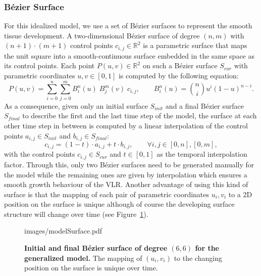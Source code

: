 \documentclass[11pt,a4paper, draft]{article}
\begin{document}
\subsubsection{B\'ezier Surface}
For this idealized model, we use a set of B\'ezier surfaces to represent the smooth tissue development. A two-dimensional B\'ezier surface of degree $(n, m)$ with $(n+1) \cdot (m+1)$ control points $c_{i, j} \in \mathbb{R}^2$ is a parametric surface that maps the unit square into a smooth-continuous surface embedded in the same space as its control points. Each point $P(u, v) \in \mathbb{R}^2$ on such a B\'ezier surface $S_{cur}$ with parametric coordinates $u ,v \in [0,1]$ is computed by the following equation:
\begin{equation}
P(u, v) = \sum_{i=0}^{n} \sum_{j=0}^{m} B_{i}^{n} (u) \; B_{j}^{m} (v) \; c_{i,j}, \qquad B_{i}^{n} (u) = \binom{n}{i} u^i (1-u)^{n-i}.
\end{equation}
As a consequence, given only an initial surface $S_{init}$ and a final B\'ezier surface $S_{final}$ to describe the first and the last time step of the model, the surface at each other time step in between is computed by a linear interpolation of the control points $a_{i,j} \in S_{init}$ and $b_{i,j} \in S_{final}$:
\begin{equation}
c_{i,j} = (1-t) \cdot a_{i,j} + t \cdot b_{i,j}, \qquad \forall i, j \in [0, n], [0, m],
\end{equation}
with the control points $c_{i,j} \in S_{cur}$ and $t \in [0,1]$ as the temporal interpolation factor. Through this, only two B\'ezier surfaces need to be generated manually for the model while the remaining ones are given by interpolation which ensures a smooth growth behaviour of the VLR. Another advantage of using this kind of surface is that the mapping of each pair of parametric coordinates $u_i, v_i$ to a 2D position on the surface is unique although of course the developing surface structure will change over time (see Figure~\ref{fig:modelSurface}).
%
\begin{figure}[htbp]
	\begin{center}
		\begin{overpic}[width=1.\linewidth]{images/modelSurface.pdf}
		\end{overpic}
\caption[Initial and final B\'ezier surface of degree $(6, 6)$ for the generalized model.]
{
{\bf Initial and final B\'ezier surface of degree $(6, 6)$ for the generalized model.} The mapping of $(u_i, v_i)$ to the changing position on the surface is unique over time.
}
	\label{fig:modelSurface}
	\end{center}
\end{figure}
%
\end{document}
